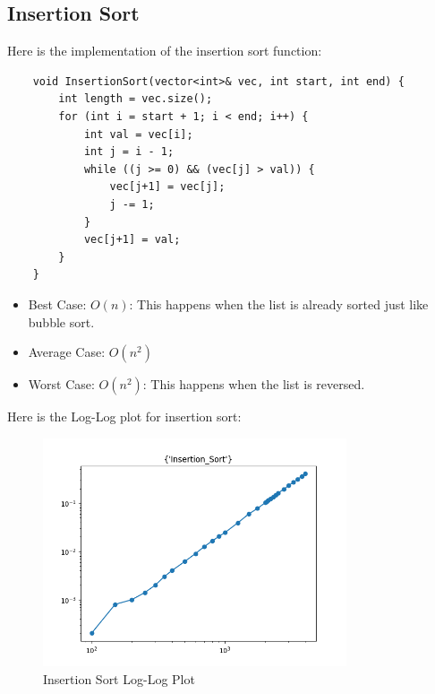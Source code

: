 \documentclass{article}
\begin{document}
\vspace{\baselineskip}
\subsection{Insertion Sort}
Here is the implementation of the insertion sort function:

\begin{verbatim}
    void InsertionSort(vector<int>& vec, int start, int end) {
        int length = vec.size();
        for (int i = start + 1; i < end; i++) {
            int val = vec[i];
            int j = i - 1;
            while ((j >= 0) && (vec[j] > val)) {
                vec[j+1] = vec[j];
                j -= 1;
            }
            vec[j+1] = val;
        }
    }
\end{verbatim}

\begin{itemize}
    \item Best Case: $O(n)$: This happens when the list is already sorted just like bubble sort.
    \item Average Case: $O(n^2)$
    \item Worst Case: $O(n^2)$: This happens when the list is reversed.
\end{itemize}

Here is the Log-Log plot for insertion sort:
\begin{figure}[H]
    \centering
    \includegraphics*[width=0.8\textwidth]{img/loglog_Insertion_Sort.png}
    \caption{Insertion Sort Log-Log Plot}
\end{figure}
\end{document}
